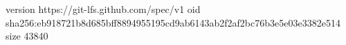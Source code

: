 version https://git-lfs.github.com/spec/v1
oid sha256:eb918721b8d685bff8894955195cd9ab6143ab2f2af2bc76b3e5e03e3382e514
size 43840
